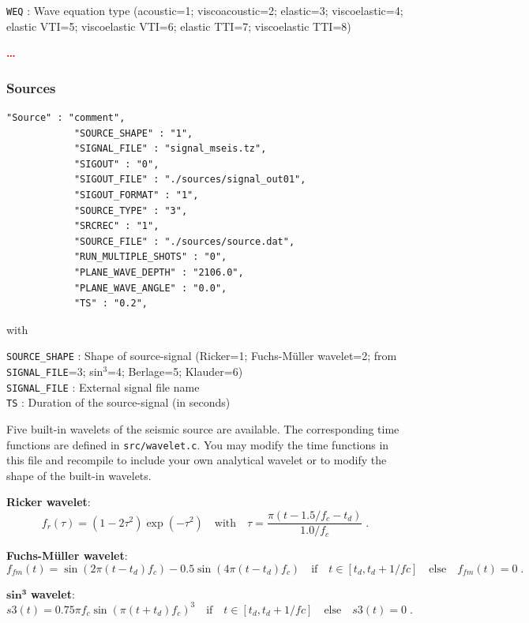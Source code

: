 \texttt{WEQ} : Wave equation type (acoustic=1; viscoacoustic=2; elastic=3; viscoelastic=4; elastic VTI=5; viscoelastic VTI=6; elastic TTI=7; viscoelastic TTI=8)

\textcolor{red}{\textbf{\dots}}

\subsubsection{Sources}
\label{sources}
\begin{verbatim}
"Source" : "comment",
            "SOURCE_SHAPE" : "1",
            "SIGNAL_FILE" : "signal_mseis.tz",
            "SIGOUT" : "0",
            "SIGOUT_FILE" : "./sources/signal_out01",
            "SIGOUT_FORMAT" : "1",
            "SOURCE_TYPE" : "3",
            "SRCREC" : "1",
            "SOURCE_FILE" : "./sources/source.dat",
            "RUN_MULTIPLE_SHOTS" : "0",
            "PLANE_WAVE_DEPTH" : "2106.0",
            "PLANE_WAVE_ANGLE" : "0.0",
            "TS" : "0.2",
\end{verbatim}

with

\texttt{SOURCE\_SHAPE} : Shape of source-signal (Ricker=1; Fuchs-M\"uller wavelet=2; from \texttt{SIGNAL\_FILE}=3; sin$^3$=4; Berlage=5; Klauder=6)\\
\texttt{SIGNAL\_FILE} : External signal file name\\
\texttt{TS} : Duration of the source-signal (in seconds)

Five built-in wavelets of the seismic source are available. The corresponding time functions are defined in \texttt{src/wavelet.c}. You may modify the time functions in this file and recompile to include your own analytical wavelet or to modify the shape of the built-in wavelets.

\textbf{Ricker wavelet}:
\begin{equation}
    f_r(\tau)=\left(1-2\tau^2\right)\exp(- \tau^2) \quad \mbox{with} \quad \tau=\frac{\pi(t-1.5/f_c-t_d)}{1.0/f_c}\;. 
    \label{eq_ricker}
\end{equation}

\textbf{Fuchs-M\"uller wavelet}:
\begin{equation}
    f_{fm}(t) =\sin(2\pi(t-t_d)f_c)-0.5\sin(4\pi(t-t_d)f_c) \quad \mbox{if} \quad t\in[t_d,t_d+1/fc] \quad \mbox{else} \quad f_{fm}(t) =0\;.
    \label{eq_fm}
\end{equation}

$\mathbf{sin^3}$ \textbf{wavelet}:
\begin{equation}
    s3(t)=0.75 \pi f_c \sin(\pi(t+t_d)f_c)^3\quad \mbox{if} \quad t \in[t_d,t_d+1/fc] \quad \mbox{else} \quad s3(t)=0\;.
\label{eq_s3}
\end{equation}

